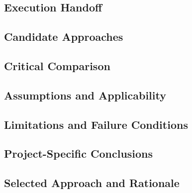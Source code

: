 \subsection{Execution Handoff}
\label{sec:res-ver-uq-execution-handoff}


\subsection{Candidate Approaches}
\label{sec:res-ver-uq-candidate-approaches}


\subsection{Critical Comparison}
\label{sec:res-ver-uq-critical-comparison}


\subsection{Assumptions and Applicability}
\label{sec:res-ver-uq-assumptions}


\subsection{Limitations and Failure Conditions}
\label{sec:res-ver-uq-limitations}


\subsection{Project-Specific Conclusions}
\label{sec:res-ver-uq-conclusions}


\subsection{Selected Approach and Rationale}
\label{sec:res-ver-uq-selected-approach}

